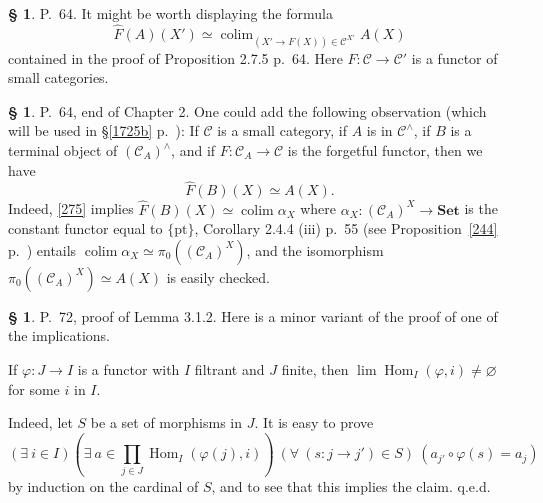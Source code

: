 \documentclass[12pt]{article}
\theoremstyle{remark}
\theoremstyle{definition}
\newtheorem{s}[thm]{\S}
\newcommand{\C}{\mathcal C}
\newcommand{\Set}{\mathbf{Set}}
\DeclareMathOperator*{\co}{colim}
\DeclareMathOperator{\Hom}{Hom}%
\begin{document}
%
\begin{s} 
P.~64. It might be worth displaying the formula 
\begin{equation}\label{275}
\widehat F(A)(X')\simeq\co_{(X'\to F(X))\in\C^{X'}}A(X)
\end{equation}
contained in the proof of Proposition 2.7.5 p.~64. Here $F:\C\to\C'$ is a functor of small categories. 
\end{s}
%
%
\begin{s}
P.~64, end of Chapter 2. One could add the following observation (which will be used in \S\ref{1725b} p.~\pageref{1725b}): If $\C$ is a small category, if $A$ is in $\C^\wedge$, if $B$ is a terminal object of $(\C_A)^\wedge$, and if $F:\C_A\to\C$ is the forgetful functor, then we have 
\begin{equation}\label{1725}
\widehat F(B)(X)\simeq A(X).
\end{equation}
Indeed, \eqref{275} implies $\widehat F(B)(X)\simeq\co\alpha_X$ where $\alpha_X:(\C_A)^X\to\Set$ is the constant functor equal to $\{\text{pt}\}$, Corollary 2.4.4 (iii) p.~55 (see Proposition~\ref{244} p.~\pageref{244}) entails $\co\alpha_X\simeq\pi_0((\C_A)^X)$, and the isomorphism $\pi_0((\C_A)^X)\simeq A(X)$ is easily checked.
\end{s}
%
%
\begin{s} 
P.~72, proof of Lemma 3.1.2. Here is a minor variant of the proof of one of the implications. 

If $\varphi:J\to I$ is a functor with $I$ filtrant and $J$ finite, then $\lim\Hom_I(\varphi,i)\neq\varnothing$ for some $i$ in $I$. 

Indeed, let $S$ be a set of morphisms in $J$. It is easy to prove 
$$
(\exists\ i\in I)\left(\exists\ a\in\prod_{j\in J}\Hom_I(\varphi(j),i)\right)\ (\forall\ (s:j\to j')\in S)\ (a_{j'}\circ\varphi(s)=a_j) 
$$ 
by induction on the cardinal of $S$, and to see that this implies the claim. q.e.d.
\end{s}
%
%
\end{document}
